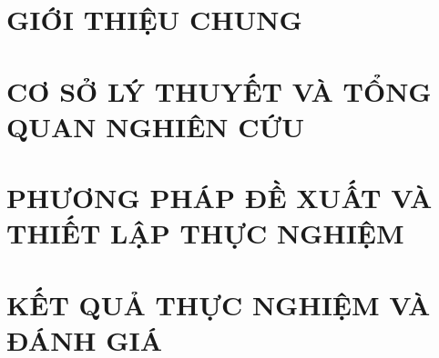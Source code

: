 \documentclass[a4paper,13pt,3p,twoside]{report}
\renewcommand{\headrulewidth}{0pt}
\theoremstyle{definition}
\begin{document}
\renewcommand{\listtablename}{DANH MỤC BẢNG BIỂU}
{\let\oldnumberline\numberline
  \renewcommand{\numberline}{Bảng~\oldnumberline}
\listoftables}

\glsaddall
\renewcommand*{\glossaryname}{Danh sách thuật ngữ}
\renewcommand*{\acronymname}{DANH MỤC THUẬT NGỮ VÀ TỪ VIẾT TẮT}
\renewcommand*{\entryname}{Thuật ngữ}
\renewcommand*{\descriptionname}{Ý nghĩa}

\newpage


%

% 

\newpage
{}

\pagestyle{fancy}
\fancyhf{}
\renewcommand{\headrulewidth}{0pt}
\fancyfoot[RE, LO]{\thepage}

\chapter{GIỚI THIỆU CHUNG}
\label{chapter:Introduction}

\newpage
\chapter{CƠ SỞ LÝ THUYẾT VÀ TỔNG QUAN NGHIÊN CỨU}
\label{chapter:Background}


\newpage
\chapter{PHƯƠNG PHÁP ĐỀ XUẤT VÀ THIẾT LẬP THỰC NGHIỆM}
\label{chapter:Proposed}


\newpage
\chapter{KẾT QUẢ THỰC NGHIỆM VÀ ĐÁNH GIÁ}
\label{chapter:Results}

\end{document}
